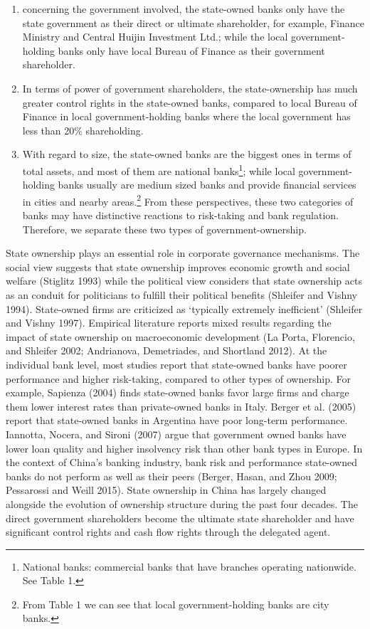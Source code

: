 \documentclass{article}
\begin{document}
\begin{enumerate}
\def\labelenumi{\arabic{enumi}.}
\item
  concerning the government involved, the state-owned banks only have
  the state government as their direct or ultimate shareholder, for
  example, Finance Ministry and Central Huijin Investment Ltd.; while
  the local government-holding banks only have local Bureau of Finance
  as their government shareholder.
\item
  In terms of power of government shareholders, the state-ownership has
  much greater control rights in the state-owned banks, compared to
  local Bureau of Finance in local government-holding banks where the
  local government has less than 20\% shareholding.
\item
  With regard to size, the state-owned banks are the biggest ones in
  terms of total assets, and most of them are national banks\footnote{National
    banks: commercial banks that have branches operating nationwide. See
    Table 1.}; while local government-holding banks usually are medium
  sized banks and provide financial services in cities and nearby
  areas.\footnote{From Table 1 we can see that local government-holding
    banks are city banks.} From these perspectives, these two categories
  of banks may have distinctive reactions to risk-taking and bank
  regulation. Therefore, we separate these two types of
  government-ownership.
\end{enumerate}

State ownership plays an essential role in corporate governance
mechanisms. The social view suggests that state ownership improves
economic growth and social welfare (Stiglitz 1993) while the political
view considers that state ownership acts as an conduit for politicians
to fulfill their political benefits (Shleifer and Vishny 1994).
State-owned firms are criticized as `typically extremely inefficient'
(Shleifer and Vishny 1997). Empirical literature reports mixed results
regarding the impact of state ownership on macroeconomic development (La
Porta, Florencio, and Shleifer 2002; Andrianova, Demetriades, and
Shortland 2012). At the individual bank level, most studies report that
state-owned banks have poorer performance and higher risk-taking,
compared to other types of ownership. For example, Sapienza (2004) finds
state-owned banks favor large firms and charge them lower interest rates
than private-owned banks in Italy. Berger et al. (2005) report that
state-owned banks in Argentina have poor long-term performance.
Iannotta, Nocera, and Sironi (2007) argue that government owned banks
have lower loan quality and higher insolvency risk than other bank types
in Europe. In the context of China's banking industry, bank risk and
performance state-owned banks do not perform as well as their peers
(Berger, Hasan, and Zhou 2009; Pessarossi and Weill 2015). State
ownership in China has largely changed alongside the evolution of
ownership structure during the past four decades. The direct government
shareholders become the ultimate state shareholder and have significant
control rights and cash flow rights through the delegated agent.
\end{document}
